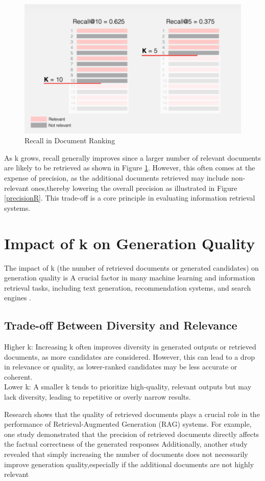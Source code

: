 \begin{figure}[h]
	\centering
	\includegraphics[width=0.7\linewidth]{Figures/recalR.png}
	\caption{Recall in Document Ranking\cite{evidentlyai2025}}
	\label{recalR}
	
\end{figure}
As k grows, recall generally improves since a larger number of relevant documents are likely to be retrieved as shown in Figure \ref{recalR}. However, this often comes at the expense of precision, as the additional documents retrieved may include non-relevant ones,thereby lowering the overall precision as illustrated in Figure \ref{precisionR}. This trade-off is a core principle in evaluating information retrieval systems.

\section{Impact of k on Generation Quality}
The impact of k (the number of retrieved documents or generated candidates) on generation quality is A crucial factor in many machine learning and information retrieval tasks, including text generation, recommendation systems, and search engines . 

\subsection{Trade-off Between Diversity and Relevance} 
Higher k: Increasing k often improves diversity in generated outputs or retrieved documents, as more candidates are considered. However, this can lead to a drop in relevance or quality, as lower-ranked candidates may be less accurate or coherent. \\
Lower k: A smaller k tends to prioritize high-quality, relevant outputs but may lack diversity, leading to repetitive or overly narrow results.

Research shows that the quality of retrieved documents plays a crucial role in the performance of Retrieval-Augmented Generation (RAG) systems. For example, one study demonstrated that the precision of retrieved documents directly affects the factual correctness of the generated responses \cite{salemi2023evaluating}
Additionally, another study revealed that simply increasing the number of documents does not necessarily improve generation quality,especially if the additional documents are not highly relevant\cite{wan2025cognitivealigneddocumentselectionretrievalaugmented}
